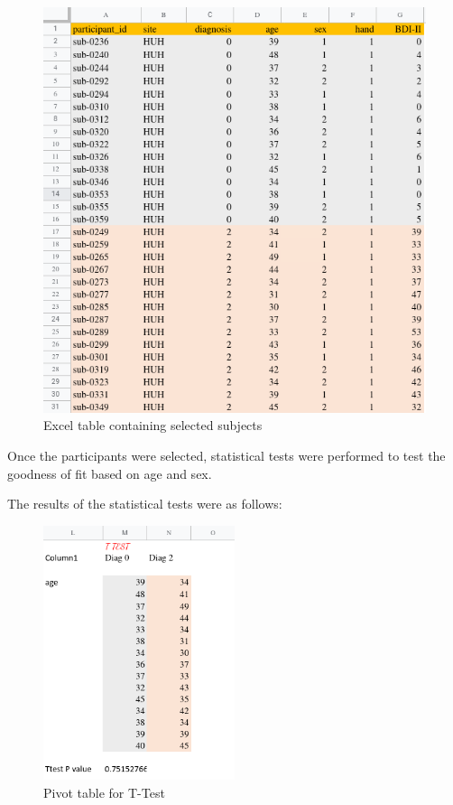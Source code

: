 \documentclass[12pt]{article}
\begin{document}
\begin{figure}[H]
  \centering
  \includegraphics[width=\textwidth]{./.img/excel-subjects.png}
  \caption{Excel table containing selected subjects}%
  \label{fig:}
\end{figure}

Once the participants were selected, statistical tests were performed
to test the goodness of fit based on age and sex.

\newpage
The results of the statistical tests were as follows:

\begin{figure}[H]
  \centering
  \includegraphics[width=0.5\textwidth]{./.img/Excel-ttest.png}
  \caption{Pivot table for T-Test}%
  \label{fig:}
\end{figure}
\end{document}
